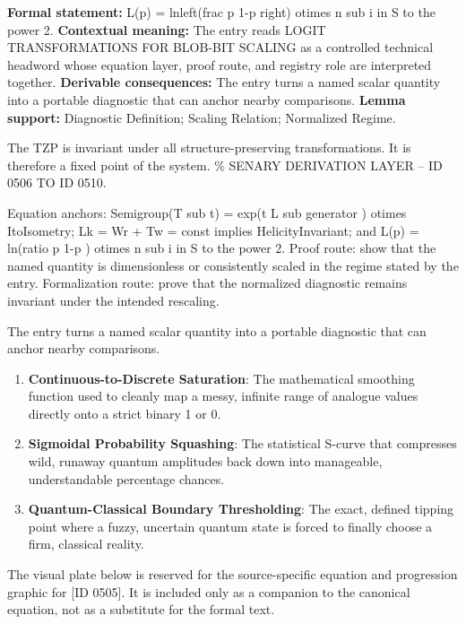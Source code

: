 \begingroup\footnotesize\setlength{\emergencystretch}{3em}\sloppy
\textbf{Formal statement:} L(p) = lnleft(frac p 1-p right) otimes n sub i in S to the power 2. \textbf{Contextual meaning:} The entry reads LOGIT TRANSFORMATIONS FOR BLOB-BIT SCALING as a controlled technical headword whose equation layer, proof route, and registry role are interpreted together. \textbf{Derivable consequences:} The entry turns a named scalar quantity into a portable diagnostic that can anchor nearby comparisons. \textbf{Lemma support:} Diagnostic Definition; Scaling Relation; Normalized Regime.\par
\endgroup

The TZP is invariant under all structure-preserving transformations. It is therefore a fixed point of the system. \% SENARY DERIVATION LAYER -- ID 0506 TO ID 0510.

Equation anchors: Semigroup(T sub t) = exp(t L sub generator ) otimes ItoIsometry; Lk = Wr + Tw = const implies HelicityInvariant; and L(p) = ln(ratio p 1-p ) otimes n sub i in S to the power 2. Proof route: show that the named quantity is dimensionless or consistently scaled in the regime stated by the entry. Formalization route: prove that the normalized diagnostic remains invariant under the intended rescaling.

The entry turns a named scalar quantity into a portable diagnostic that can anchor nearby comparisons.
\endgroup

\begin{enumerate}[leftmargin=1.6em,itemsep=6pt,topsep=4pt]
\item \textbf{Continuous-to-Discrete Saturation}: The mathematical smoothing function used to cleanly map a messy, infinite range of analogue values directly onto a strict binary 1 or 0.
\item \textbf{Sigmoidal Probability Squashing}: The statistical S-curve that compresses wild, runaway quantum amplitudes back down into manageable, understandable percentage chances.
\item \textbf{Quantum-Classical Boundary Thresholding}: The exact, defined tipping point where a fuzzy, uncertain quantum state is forced to finally choose a firm, classical reality.
\end{enumerate}

\begingroup\footnotesize\sloppy
The visual plate below is reserved for the source-specific equation and progression graphic for [ID 0505]. It is included only as a companion to the canonical equation, not as a substitute for the formal text.
\par\endgroup
\ifTZPDarkEdition
{}
\fi

